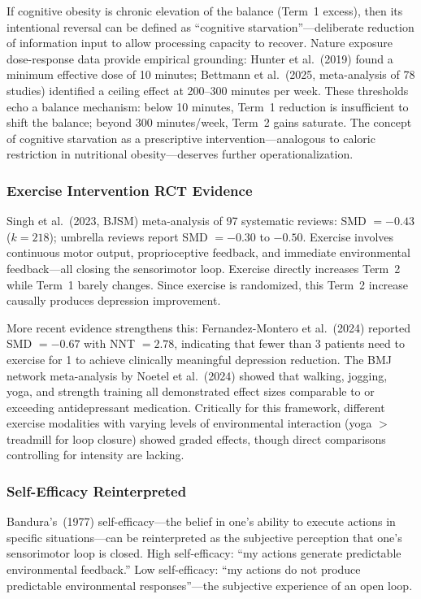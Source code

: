 \documentclass[a4paper,11pt,titlepage]{article}
\begin{document}
If cognitive obesity is chronic elevation of the balance (Term~1 excess), then its intentional reversal can be defined as ``cognitive starvation''---deliberate reduction of information input to allow processing capacity to recover. Nature exposure dose-response data provide empirical grounding: Hunter et al.~(2019) found a minimum effective dose of 10 minutes; Bettmann et al.~(2025, meta-analysis of 78 studies) identified a ceiling effect at 200--300 minutes per week. These thresholds echo a balance mechanism: below 10 minutes, Term~1 reduction is insufficient to shift the balance; beyond 300 minutes/week, Term~2 gains saturate. The concept of cognitive starvation as a prescriptive intervention---analogous to caloric restriction in nutritional obesity---deserves further operationalization.

\subsubsection{Exercise Intervention RCT Evidence}

Singh et al.~(2023, BJSM) meta-analysis of 97 systematic reviews: SMD $= -0.43$ ($k = 218$); umbrella reviews report SMD $= -0.30$ to $-0.50$. Exercise involves continuous motor output, proprioceptive feedback, and immediate environmental feedback---all closing the sensorimotor loop. Exercise directly increases Term~2 while Term~1 barely changes. Since exercise is randomized, this Term~2 increase causally produces depression improvement.

More recent evidence strengthens this: Fernandez-Montero et al.~(2024) reported SMD $= -0.67$ with NNT $= 2.78$, indicating that fewer than 3 patients need to exercise for 1 to achieve clinically meaningful depression reduction. The BMJ network meta-analysis by Noetel et al.~(2024) showed that walking, jogging, yoga, and strength training all demonstrated effect sizes comparable to or exceeding antidepressant medication. Critically for this framework, different exercise modalities with varying levels of environmental interaction (yoga $>$ treadmill for loop closure) showed graded effects, though direct comparisons controlling for intensity are lacking.

\subsubsection{Self-Efficacy Reinterpreted}

Bandura's~(1977) self-efficacy---the belief in one's ability to execute actions in specific situations---can be reinterpreted as the subjective perception that one's sensorimotor loop is closed. High self-efficacy: ``my actions generate predictable environmental feedback.'' Low self-efficacy: ``my actions do not produce predictable environmental responses''---the subjective experience of an open loop.
\end{document}
